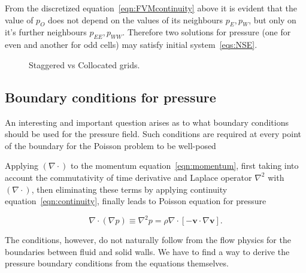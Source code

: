 \documentclass{article}
\begin{document}
From the discretized equation~\eqref{eqn:FVMcontinuity} above it is evident that the value of  $p_O$ does not depend on the values of its neighbours $p_E,p_W$, but only on it's further neighbours $p_{EE},p_{WW}$. Therefore two solutions for pressure (one for even and another for odd cells) may satisfy initial system~\eqref{eqs:NSE}.
 
\begin{figure}
\centering
   \quad
\caption{\small Staggered vs Collocated grids.}
\end{figure}

\subsection{Boundary conditions for pressure}\label{sec:boundary-conditions-for-pressure}

An interesting and important question arises as to what boundary conditions should be used for the pressure field. Such conditions are required at every point of the boundary for the Poisson problem to be well-posed 

Applying $(\nabla \cdot)$ to the momentum equation~\eqref{eqn:momentum}, first taking into account the commutativity of time derivative and Laplace operator $\nabla^2$ with $(\nabla \cdot)$, then eliminating these terms by applying continuity equation~\eqref{eqn:continuity}, finally leads to Poisson equation for pressure

\begin{equation}\label{eqn:pressure-poisson}
\nabla \cdot(\nabla p) \equiv \nabla^2 p=\rho \nabla \cdot[-\boldsymbol{v} \cdot \nabla \boldsymbol{v}].
\end{equation}



The conditions, however, do not naturally follow from the flow physics for the boundaries between fluid and solid walls. We have to find a way to derive the pressure boundary conditions from the equations themselves.
\end{document}
